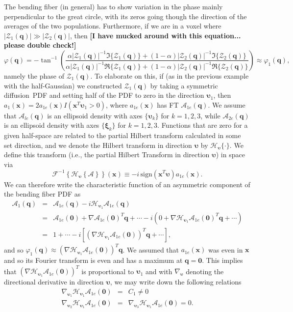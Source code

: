 \documentclass[authoryear,preprint,12pt]{elsarticle}
\newcommand{\q}{\mathbf{q}}
\newcommand{\bsu}{\bs{\upsilon}}
\newcommand{\x}{\mathbf{x}}
\newcommand{\cA}{\mathcal{A}}
\newcommand{\cF}{\mathcal{F}}
\newcommand{\cH}{\mathcal{H}}
\newcommand{\cZ}{\mathcal{Z}}
\newcommand{\bld}[1]{\mathbf{#1}}
\newcommand{\bs}[1]{\boldsymbol{#1}}
\begin{document}
The bending fiber (in general) has to show variation in the phase
mainly perpendicular to the great circle, with its zeros going though
the direction of the averages of the two populations.  Furthermore, if
we are in a voxel where $|\cZ_1(\q)|\gg|\cZ_2(\q)|$, then \textbf{[I
    have mucked around with this equation... please double check!]}
\begin{equation}
  \varphi(\q) = -\tan^{-1} \left(\frac{\alpha |\cZ_1(\q)|^{-1}
    \Im\{\cZ_1(\q)\} + (1-\alpha) |\cZ_2(\q)|^{-1} \Im\{\cZ_2(\q)\}}
         {\alpha |\cZ_1(\q)|^{-1} \Re\{\cZ_1(\q)\} + (1-\alpha)
           |\cZ_2(\q)|^{-1} \Re\{\cZ_2(\q)\}} \right) \approx
         \varphi_1(\q),
\end{equation}
namely the phase of $\cZ_1(\q)$.  To elaborate on this, if (as in the
previous example with the half-Gaussian) we constructed $\cZ_1(\q)$ by
taking a symmetric diffusion~PDF and setting half of the PDF to zero
in the direction $\bsu_1$, then $a_1(\x)=2a_{1e}(\x)I(\x^T\bsu_1>0)$,
where $ a_{1e}(\x)$ has FT $\cA_{1e}(\q)$.  We assume that
$\cA_{le}(\q)$ is an ellipsoid density with axes $\{\bsu_k\}$ for
$k=1,2,3$, while $\cA_{2e}(\q)$ is an ellipsoid density with axes
$\{\bs{\xi}_k\}$ for $k=1,2,3$.  Functions that are zero for a given
half-space are related to the partial Hilbert transform
\citep{Granlund} calculated in some set direction, and we denote the
Hilbert transform in direction $\bsu$ by $\cH_{\bsu}\{\cdot\}$.  We
define this transform (i.e., the partial Hilbert Transform in
direction $\bsu$) in space via
\begin{equation}
  \cF^{-1}\left\{\cH_{\bsu}\left\{\cA\right\}\right\}(\x) \equiv -i \,
  \text{sign}\left(\x^T\bsu\right)a_{1e}(\x).
\end{equation}
We can therefore write the characteristic function of an asymmetric
component of the bending fiber PDF as
\begin{eqnarray}
  \cA_1(\q) &=& \cA_{1e}(\q) - i \cH_{\bsu_1}\cA_{1e}(\q) \nonumber\\
  &=& \cA_{1e}(\bld{0})+\nabla \cA_{1e}(\bld{0})^T\q + \cdots - i
  \left(0 + \nabla\cH_{\bsu_1}\cA_{1e}(\bld{0})^T\q + \cdots\right) \nonumber\\
  &=& 1 + \cdots - i
  \left[\left(\nabla\cH_{\bsu_1}\cA_{1e}(\bld{0})\right)^T\q +
  \cdots\right],
\end{eqnarray}
and so
$\varphi_1(\q)\approx(\nabla\cH_{\bsu_1}\cA_{1e}(\bld{0}))^T\q$.  We
assumed that $a_{1e}(\x)$ was even in $\x$ and so its Fourier
transform is even and has a maximum at $\q=\bld{0}$.  This implies
that $(\nabla\cH_{\bsu_1}\cA_{1e}(\bld{0}))^T$ is proportional to
$\bsu_1$ and with $\nabla_{\bsu}$ denoting the directional derivative
in direction $\bsu$, we may write down the following relations
\begin{eqnarray}
  \nabla_{\bsu_1}\cH_{\bsu_1}\cA_{1e}(\bld{0}) &=& C_1 \neq 0\\
  \nabla_{\bsu_2}\cH_{\bsu_1}\cA_{1e}(\bld{0}) &=& \nabla_{\bsu_3}
  \cH_{\bsu_1}\cA_{1e}(\bld{0}) = 0.
\end{eqnarray}
\end{document}
